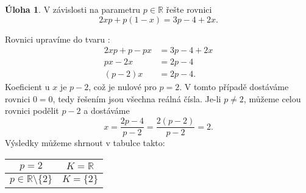 \documentclass[12pt,a4paper]{article}
\newcommand{\R}{\mathbb{R}}
\theoremstyle{definition}
\newtheorem{uloha}{Úloha}
\newenvironment{res}{\proof}{\endproof}
\begin{document}
\renewcommand*{\proofname}{Řešení}


\begin{uloha}
V závislosti na parametru $p \in \R$ řešte rovnici
\[ 2 x p + p (1 - x) = 3 p - 4 + 2 x. \]
\end{uloha}
\begin{res}
Rovnici upravíme do tvaru :
\begin{align*}
2xp + p - px &= 3p - 4 + 2x \\
px - 2x &= 2p - 4 \\
(p - 2)x &= 2p - 4.
\end{align*}
Koeficient u $x$ je $p - 2$, což je nulové pro $p = 2$. V tomto případě dostáváme rovnici $0 = 0$, tedy řešením jsou všechna reálná čísla. Je-li $p \neq 2$, můžeme celou rovnici podělit $p-2$ a dostáváme
\[ x = \frac{2p-4}{p-2} = \frac{2(p-2)}{p-2} = 2. \]
Výsledky můžeme shrnout v tabulce takto:
\begin{center}
\begin{tabular}{c|c}
$p = 2$ & $K = \R$ \\ \hline
$p \in \R \setminus \{2\}$ & $K = \{2\}$
\end{tabular}
\end{center}
\end{res}
\end{document}
